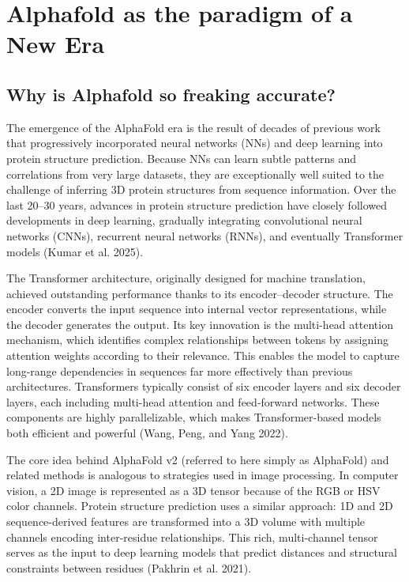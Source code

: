 \documentclass[
]{scrbook}
\begin{document}
\chapter{Alphafold as the paradigm of a New Era}\label{sec-AF2}

\section{Why is Alphafold so freaking
accurate?}\label{why-is-alphafold-so-freaking-accurate}

The emergence of the AlphaFold era is the result of decades of previous
work that progressively incorporated neural networks (NNs) and deep
learning into protein structure prediction. Because NNs can learn subtle
patterns and correlations from very large datasets, they are
exceptionally well suited to the challenge of inferring 3D protein
structures from sequence information. Over the last 20--30 years,
advances in protein structure prediction have closely followed
developments in deep learning, gradually integrating convolutional
neural networks (CNNs), recurrent neural networks (RNNs), and eventually
Transformer models (Kumar et al. 2025).

The Transformer architecture, originally designed for machine
translation, achieved outstanding performance thanks to its
encoder--decoder structure. The encoder converts the input sequence into
internal vector representations, while the decoder generates the output.
Its key innovation is the multi-head attention mechanism, which
identifies complex relationships between tokens by assigning attention
weights according to their relevance. This enables the model to capture
long-range dependencies in sequences far more effectively than previous
architectures. Transformers typically consist of six encoder layers and
six decoder layers, each including multi-head attention and feed‑forward
networks. These components are highly parallelizable, which makes
Transformer-based models both efficient and powerful (Wang, Peng, and
Yang 2022).

The core idea behind AlphaFold v2 (referred to here simply as AlphaFold)
and related methods is analogous to strategies used in image processing.
In computer vision, a 2D image is represented as a 3D tensor because of
the RGB or HSV color channels. Protein structure prediction uses a
similar approach: 1D and 2D sequence-derived features are transformed
into a 3D volume with multiple channels encoding inter-residue
relationships. This rich, multi-channel tensor serves as the input to
deep learning models that predict distances and structural constraints
between residues (Pakhrin et al. 2021).
\end{document}
